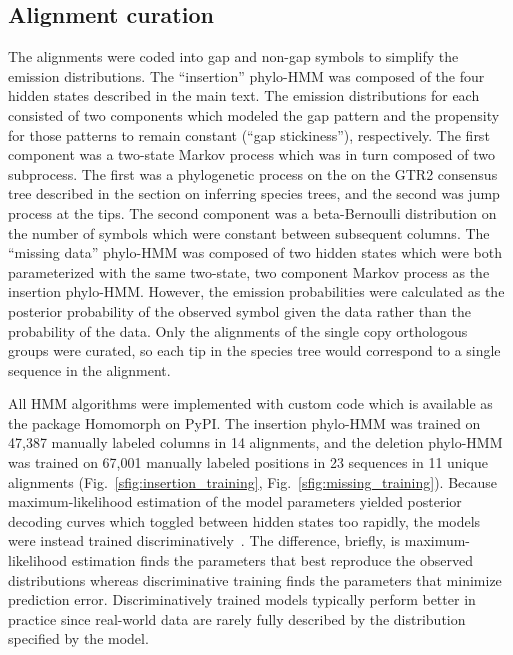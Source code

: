\subsection*{Alignment curation}
The alignments were coded into gap and non-gap symbols to simplify the emission distributions. The ``insertion'' phylo-HMM was composed of the four hidden states described in the main text. The emission distributions for each consisted of two components which modeled the gap pattern and the propensity for those patterns to remain constant (``gap stickiness''), respectively. The first component was a two-state Markov process which was in turn composed of two subprocess. The first was a phylogenetic process on the on the GTR2 consensus tree described in the section on inferring species trees, and the second was jump process at the tips. The second component was a beta-Bernoulli distribution on the number of symbols which were constant between subsequent columns. The ``missing data'' phylo-HMM was composed of two hidden states which were both parameterized with the same two-state, two component Markov process as the insertion phylo-HMM. However, the emission probabilities were calculated as the posterior probability of the observed symbol given the data rather than the probability of the data. Only the alignments of the single copy orthologous groups were curated, so each tip in the species tree would correspond to a single sequence in the alignment.

All HMM algorithms were implemented with custom code which is available as the package Homomorph on PyPI. The insertion phylo-HMM was trained on 47,387 manually labeled columns in 14 alignments, and the deletion phylo-HMM was trained on 67,001 manually labeled positions in 23 sequences in 11 unique alignments (Fig.~\ref{sfig:insertion_training}, Fig.~\ref{sfig:missing_training}). Because maximum-likelihood estimation of the model parameters yielded posterior decoding curves which toggled between hidden states too rapidly, the models were instead trained discriminatively~\cite{Krogh1999}. The difference, briefly, is maximum-likelihood estimation finds the parameters that best reproduce the observed distributions whereas discriminative training finds the parameters that minimize prediction error. Discriminatively trained models typically perform better in practice since real-world data are rarely fully described by the distribution specified by the model.

